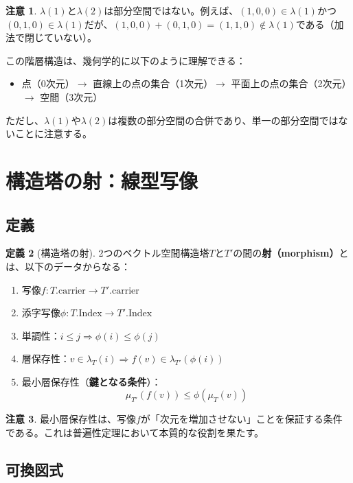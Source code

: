 \documentclass[a4paper,11pt]{ltjsarticle}
\theoremstyle{definition}
\newtheorem{definition}{定義}[section]
\newtheorem{remark}[definition]{注意}
\begin{document}
\begin{remark}
$\lambda(1)$と$\lambda(2)$は部分空間ではない。例えば、$(1,0,0) \in \lambda(1)$かつ$(0,1,0) \in \lambda(1)$だが、$(1,0,0) + (0,1,0) = (1,1,0) \notin \lambda(1)$である（加法で閉じていない）。
\end{remark}

この階層構造は、幾何学的に以下のように理解できる：
\begin{itemize}
  \item 点（0次元）$\to$ 直線上の点の集合（1次元）$\to$ 平面上の点の集合（2次元）$\to$ 空間（3次元）
\end{itemize}
ただし、$\lambda(1)$や$\lambda(2)$は複数の部分空間の合併であり、単一の部分空間ではないことに注意する。

\section{構造塔の射：線型写像}

\subsection{定義}

\begin{definition}[構造塔の射]
2つのベクトル空間構造塔$T$と$T'$の間の\textbf{射（morphism）}とは、以下のデータからなる：
\begin{enumerate}
  \item 写像$f : T.\text{carrier} \to T'.\text{carrier}$
  \item 添字写像$\phi : T.\text{Index} \to T'.\text{Index}$
  \item 単調性：$i \leq j \Rightarrow \phi(i) \leq \phi(j)$
  \item 層保存性：$v \in \lambda_T(i) \Rightarrow f(v) \in \lambda_{T'}(\phi(i))$
  \item 最小層保存性（\textbf{鍵となる条件}）：
  \[
  \mu_{T'}(f(v)) \leq \phi(\mu_T(v))
  \]
\end{enumerate}
\end{definition}

\begin{remark}
最小層保存性は、写像$f$が「次元を増加させない」ことを保証する条件である。これは普遍性定理において本質的な役割を果たす。
\end{remark}

\subsection{可換図式}
\end{document}
